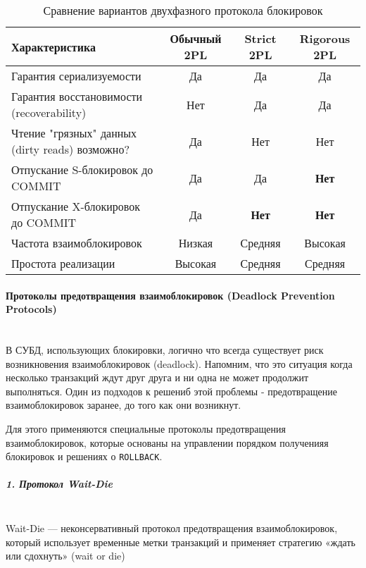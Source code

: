 \begin{table}[H]
     \centering
     \begin{tabular}{|l|c|c|c|}
         \hline
         \textbf{Характеристика} & \textbf{Обычный 2PL} & \textbf{Strict 2PL} & \textbf{Rigorous 2PL} \\
         \hline
         Гарантия сериализуемости & Да & Да & Да \\
         \hline
         Гарантия восстановимости (recoverability) & Нет & Да & Да \\
         \hline
         Чтение "грязных" данных (dirty reads) возможно? & Да & Нет & Нет \\
         \hline
         Отпускание S-блокировок до COMMIT & Да & Да & \textbf{Нет} \\
         \hline
         Отпускание X-блокировок до COMMIT & Да & \textbf{Нет} & \textbf{Нет} \\
         \hline
         Частота взаимоблокировок & Низкая & Средняя & Высокая \\
         \hline
         Простота реализации & Высокая & Средняя & Средняя \\
         \hline
     \end{tabular}
     \caption{Сравнение вариантов двухфазного протокола блокировок}
 \end{table}
 
 \paragraph{Протоколы предотвращения взаимоблокировок (Deadlock Prevention Protocols)} ~\\
 
 В СУБД, использующих блокировки, логично что всегда существует риск возникновения взаимоблокировок (deadlock). Напомним, что это ситуация когда несколько транзакций ждут друг друга и ни одна не может продолжит выполняться. Один из подходов к решениб этой проблемы - предотвращение взаимоблокировок заранее, до того как они возникнут.
 
 Для этого применяются специальные протоколы предотвращения взаимоблокировок, которые основаны на управлении порядком полученияя блокировок и решениях о \texttt{ROLLBACK}. \autocite{Silberschatz, ElmasriNavathe}
 
 \subparagraph{1. Протокол Wait-Die} ~\\
 
 Wait-Die — неконсервативный протокол предотвращения взаимоблокировок, который использует временные метки транзакций и применяет стратегию «ждать или сдохнуть» (wait or die)
 

